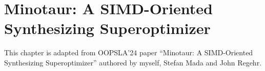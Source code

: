 \chapter{Minotaur: A SIMD-Oriented Synthesizing Superoptimizer}
\label{chap:minotaur}

This chapter is adapted from OOPSLA'24 paper ``Minotaur: A SIMD-Oriented
Synthesizing Superoptimizer'' authored by myself, Stefan Mada and John
Regehr.







